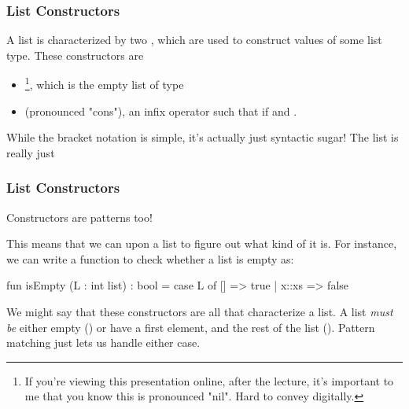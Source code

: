 \documentclass[aspectratio=169]{beamer}
\begin{document}
\begin{frame}[fragile]
  \frametitle{List Constructors}

  A list is characterized by two , which are used to construct
  values of some list type. These constructors are
  \pause
  \begin{itemize}
    \item \code{[]}\footnote{
      If you're viewing this presentation online, after the lecture, it's
      important to me that you know this is pronounced "nil". Hard to convey digitally.
    }, which is the empty list of type  \pause
    \item \code{::} (pronounced "cons"), an infix operator such that
     if  and .
  \end{itemize}

  \pause
  \vspace{\fill}

  While the bracket notation is simple, it's actually just syntactic sugar! The
  list \code{[1, 2, 3]} is really just 

  \pause
  \vspace{\fill}


  \tgs
\end{frame}


\begin{frame}[fragile]
  \frametitle{List Constructors}

  Constructors are patterns too!

  \pause
  \vspace{\fill}

  This means that we can  upon a list to figure out what kind of
   it is. For instance, we can write a function to check whether
  a list is empty as:

  \pause

  \begin{codeblock}
    fun isEmpty (L : int list) : bool =
      case L of
        [] => true
      | x::xs => false
  \end{codeblock}

  \pause
  \vspace{\fill}

  We might say that these constructors are all that characterize a list. A list
  \textit{must be} either empty (\code{[]}) or have a first element, and the rest of
  the list (). Pattern matching just lets us handle either case.
\end{frame}
\end{document}
